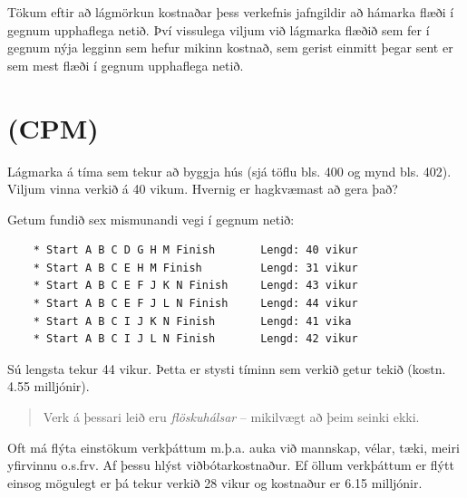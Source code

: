 Tökum eftir að lágmörkun kostnaðar þess verkefnis jafngildir að hámarka flæði í gegnum upphaflega netið. Því vissulega viljum við lágmarka flæðið sem fer í gegnum nýja legginn sem hefur mikinn kostnað, sem gerist einmitt þegar sent er sem mest flæði í gegnum upphaflega netið.



\section{ (CPM)}
\begin{daemi}[Verkefnastjórnun] Lágmarka á tíma sem tekur að byggja  hús (sjá töflu bls. 400 og mynd bls. 402). 
Viljum vinna verkið á 40 vikum. Hvernig er hagkvæmast að gera það?
\end{daemi}
\begin{lausn}
Getum fundið sex mismunandi vegi í gegnum netið:
{\footnotesize
\begin{verbatim}
    * Start A B C D G H M Finish       Lengd: 40 vikur
    * Start A B C E H M Finish         Lengd: 31 vikur
    * Start A B C E F J K N Finish     Lengd: 43 vikur
    * Start A B C E F J L N Finish     Lengd: 44 vikur
    * Start A B C I J K N Finish       Lengd: 41 vika
    * Start A B C I J L N Finish       Lengd: 42 vikur
\end{verbatim}}
Sú lengsta tekur 44 vikur. Þetta er stysti tíminn sem verkið getur tekið (kostn. 4.55 milljónir).
\begin{quote} Verk á þessari leið eru \emph{flöskuhálsar} -- mikilvægt að þeim seinki ekki.
\end{quote}
Oft má flýta einstökum verkþáttum m.þ.a. auka við mannskap, vélar, tæki, meiri yfirvinnu o.s.frv. Af þessu hlýst viðbótarkostnaður. Ef öllum verk\-þáttum er flýtt einsog mögulegt er þá tekur verkið 28 vikur og kostnaður er 6.15 milljónir. 


\end{lausn}
